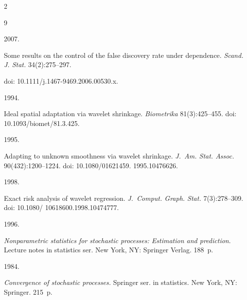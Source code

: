 \begin{multicols}{2}
{{\begin{thebibliography}{9}

 2007. 

Some results on the control of the false discovery rate under dependence. \textit{Scand. J. Stat.} 34(2):275--297.

doi: 10.1111/j.1467-9469.2006.00530.x.




 1994. 

Ideal spatial adaptation via wavelet shrinkage. \textit{Biometrika} 81(3):425--455. doi: 10.1093/biomet/81.3.425.




 1995.

Adapting to unknown smoothness via wavelet shrinkage. \textit{J.~Am. Stat. Assoc.} 90(432):1200--1224. doi: 10.1080/01621459. 1995.10476626.




 1998. 

Exact risk analysis of wavelet regression. \textit{J.~Comput. Graph. Stat.} 7(3):278--309. doi: 10.1080/ 10618600.1998.10474777.




 1996.

\textit{Nonparametric statistics for stochastic processes: Estimation and prediction}. Lecture notes in statistics ser. New York, NY: Springer Verlag. 188~p.






 1984. 

\textit{Convergence of stochastic processes.} Springer ser. in statistics. New York, NY: Springer. 215~p.

\end{thebibliography}



 }

 }



\end{multicols}



